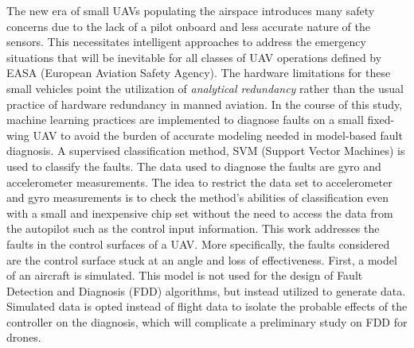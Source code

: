 % 
% 
%

The new era of small UAVs populating the airspace introduces many safety concerns due to the lack of a pilot onboard and less accurate nature of the sensors. 
This necessitates intelligent approaches to address the emergency situations that will be inevitable for all classes of UAV operations defined by EASA (European Aviation Safety Agency). 
The hardware limitations for these small vehicles point the utilization of \emph{analytical redundancy} rather than the usual practice of hardware redundancy in manned aviation. 
In the course of this study, machine learning practices are implemented to diagnose faults on a small fixed-wing UAV to avoid the burden of accurate modeling needed in model-based fault diagnosis. 
A supervised classification method, SVM (Support Vector Machines) is used to classify the faults. 
The data used to diagnose the faults are gyro and accelerometer measurements. 
The idea to restrict the data set to accelerometer and gyro measurements is to check the method's abilities of classification even with a small and inexpensive chip set without the need to access the data from the autopilot such as the control input information. 
This work addresses the faults in the control surfaces of a UAV. 
More specifically, the faults considered are the control surface stuck at an angle and loss of effectiveness. 
First, a model of an aircraft is simulated. This model is not used for the design of Fault Detection and Diagnosis (FDD) algorithms, but instead utilized to generate data. 
Simulated data is opted instead of flight data to isolate the probable effects of the controller on the diagnosis, which will complicate a preliminary study on FDD for drones.
